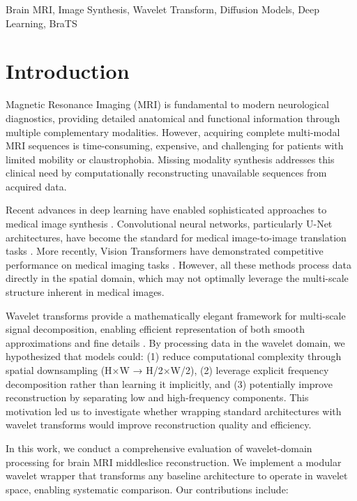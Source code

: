 \documentclass[conference]{IEEEtran}
\begin{document}
\begin{IEEEkeywords}
Brain MRI, Image Synthesis, Wavelet Transform, Diffusion Models, Deep Learning, BraTS
\end{IEEEkeywords}

\section{Introduction}

Magnetic Resonance Imaging (MRI) is fundamental to modern neurological diagnostics, providing detailed anatomical and functional information through multiple complementary modalities. However, acquiring complete multi-modal MRI sequences is time-consuming, expensive, and challenging for patients with limited mobility or claustrophobia. Missing modality synthesis addresses this clinical need by computationally reconstructing unavailable sequences from acquired data.

Recent advances in deep learning have enabled sophisticated approaches to medical image synthesis \cite{wang2021medical, dayarathna2024deep}. Convolutional neural networks, particularly U-Net architectures, have become the standard for medical image-to-image translation tasks \cite{ronneberger2015unet}. More recently, Vision Transformers have demonstrated competitive performance on medical imaging tasks \cite{dosovitskiy2021image, shamshad2023transformers}. However, all these methods process data directly in the spatial domain, which may not optimally leverage the multi-scale structure inherent in medical images.

Wavelet transforms provide a mathematically elegant framework for multi-scale signal decomposition, enabling efficient representation of both smooth approximations and fine details \cite{mallat1989theory}. By processing data in the wavelet domain, we hypothesized that models could: (1) reduce computational complexity through spatial downsampling (H×W → H/2×W/2), (2) leverage explicit frequency decomposition rather than learning it implicitly, and (3) potentially improve reconstruction by separating low and high-frequency components. This motivation led us to investigate whether wrapping standard architectures with wavelet transforms would improve reconstruction quality and efficiency.

In this work, we conduct a comprehensive evaluation of wavelet-domain processing for brain MRI middleslice reconstruction. We implement a modular wavelet wrapper that transforms any baseline architecture to operate in wavelet space, enabling systematic comparison. Our contributions include:
\end{document}
